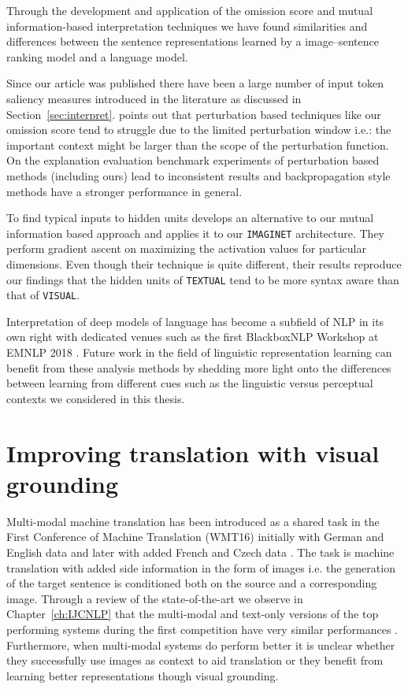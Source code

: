 Through the development and application of the omission score and 
mutual information-based interpretation techniques we have found similarities and differences between
the sentence representations learned by a image--sentence ranking model 
and a language model. 

Since our article was published there have been a large number of input token saliency 
measures introduced in the literature as discussed in Section~\ref{sec:interpret}. 
\cite{shrikumar2017learning}
points out that perturbation based techniques like our omission score tend to struggle
 due to the limited perturbation window i.e.: the
important context might be larger than the scope of the perturbation function. 
On the explanation evaluation benchmark experiments of \cite{poerner2018evaluating} 
perturbation based methods (including ours) lead to inconsistent results and backpropagation style
methods \citep{bach2015pixel,shrikumar2017learning} have a stronger performance in general.

To find typical inputs to hidden units \cite{poerner2018interpretable} develops an alternative
to our mutual information based approach and applies it to our \texttt{IMAGINET} architecture.
They perform gradient ascent on maximizing the activation values for particular dimensions.
Even though their technique is quite different, their results reproduce our findings that the hidden 
units of \texttt{TEXTUAL} tend to be more syntax aware than that of \texttt{VISUAL}.

Interpretation of deep models of language has become a subfield of NLP in its own right
with dedicated venues such as the first BlackboxNLP Workshop at EMNLP 2018
\citep{alishahi2019analyzing}. Future work in the field of linguistic representation learning
can benefit from these analysis methods by shedding more light onto the differences between
learning from different cues such as the linguistic versus perceptual contexts we considered in 
this thesis.



\section{Improving translation with visual grounding}

Multi-modal machine translation has been introduced as a shared task in the
First Conference of Machine Translation (WMT16) \citep{specia2016shared} initially with
German and English  \citep{elliott2016multi30k} data and
later with added French and Czech data \citep{elliott2017findings}. The task is 
machine translation with added side information in the form of images i.e. the generation of the target sentence 
is conditioned both on the source and a corresponding image.
Through a review of the state-of-the-art we observe in Chapter~\ref{ch:IJCNLP} 
that the multi-modal and text-only versions of 
the top performing systems during the first competition
have very similar performances \citep{specia2016observed}. 
Furthermore, when multi-modal systems do perform better it is unclear whether they successfully use images as 
context to aid translation or they benefit from learning better representations though visual grounding.


